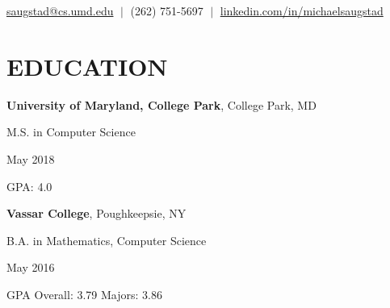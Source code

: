 \documentclass{res}
\newcommand{\vb}{\; | \;}
\begin{document}
 
                                  
\begin{resume}
\vspace{-5pt}
{\large %
  \begin{center}
    \href{mailto:saugstad@cs.umd.edu}{saugstad@cs.umd.edu} $\vb$
    (262) 751-5697 $\vb$
    \href{https://www.linkedin.com/in/michaelsaugstad/}
         {linkedin.com/in/michaelsaugstad}
  \end{center}

  \vspace{-2pt}
  \section{\hspace{0.2in}EDUCATION}
    \vspace{3pt} %
    {\bf University of Maryland, College Park}, College Park, MD\\
    \begin{minipage}{5.6in}
      M.S. in Computer Science
    \end{minipage}
    \begin{minipage}{2in}
      May 2018
    \end{minipage}
    GPA: 4.0

    \vspace{-5pt} %
    {\bf Vassar College}, Poughkeepsie, NY\\
    \begin{minipage}{5.6in}
      B.A. in Mathematics, Computer Science
    \end{minipage}
    \begin{minipage}{2in}
      May 2016
    \end{minipage}
    GPA Overall: 3.79  Majors: 3.86

  \vspace{-1pt}
}
\end{resume}
\end{document}
